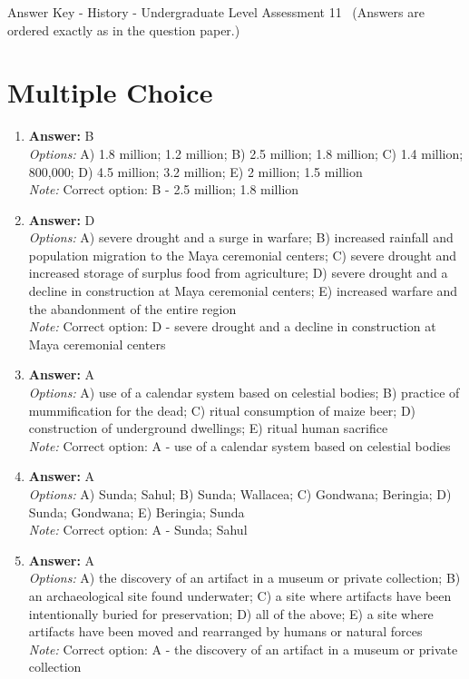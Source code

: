 \documentclass[12pt]{article}
\begin{document}
\begin{center}
Answer Key - History - Undergraduate Level Assessment 11 \
\small (Answers are ordered exactly as in the question paper.)
\end{center}

\section*{Multiple Choice}
\begin{enumerate}[label=\arabic*.]
\item \textbf{Answer:} B
\\ \textit{Options:} A) 1.8 million; 1.2 million; B) 2.5 million; 1.8 million; C) 1.4 million; 800,000; D) 4.5 million; 3.2 million; E) 2 million; 1.5 million
\\ \textit{Note:} Correct option: B - 2.5 million; 1.8 million
\item \textbf{Answer:} D
\\ \textit{Options:} A) severe drought and a surge in warfare; B) increased rainfall and population migration to the Maya ceremonial centers; C) severe drought and increased storage of surplus food from agriculture; D) severe drought and a decline in construction at Maya ceremonial centers; E) increased warfare and the abandonment of the entire region
\\ \textit{Note:} Correct option: D - severe drought and a decline in construction at Maya ceremonial centers
\item \textbf{Answer:} A
\\ \textit{Options:} A) use of a calendar system based on celestial bodies; B) practice of mummification for the dead; C) ritual consumption of maize beer; D) construction of underground dwellings; E) ritual human sacrifice
\\ \textit{Note:} Correct option: A - use of a calendar system based on celestial bodies
\item \textbf{Answer:} A
\\ \textit{Options:} A) Sunda; Sahul; B) Sunda; Wallacea; C) Gondwana; Beringia; D) Sunda; Gondwana; E) Beringia; Sunda
\\ \textit{Note:} Correct option: A - Sunda; Sahul
\item \textbf{Answer:} A
\\ \textit{Options:} A) the discovery of an artifact in a museum or private collection; B) an archaeological site found underwater; C) a site where artifacts have been intentionally buried for preservation; D) all of the above; E) a site where artifacts have been moved and rearranged by humans or natural forces
\\ \textit{Note:} Correct option: A - the discovery of an artifact in a museum or private collection
\end{enumerate}
\end{document}
